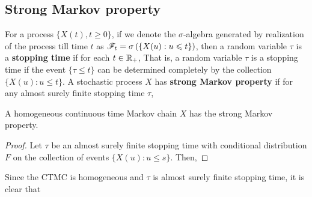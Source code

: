 \documentclass[a4paper,10pt,english]{article}
\begin{document}
\subsection{Strong Markov property}
For a process $\{X(t), t\geqslant 0\}$,  if we denote the $\sigma$-algebra generated by realization of the process till time $t$ as 
$\mathscr{F}_t = \sigma\left(\{X(u): u \leqslant t\}\right)$, 
then a random variable $\tau$ is a \textbf{stopping time} if for each $t \in \mathbb{R}_+$, 
That is, a random variable $\tau$ is a stopping time if the event $\{\tau \leq t\}$ can be determined completely by the collection $\{X(u): u \leqslant t\}$. 
A stochastic process $X$ has \textbf{strong Markov property} if for any almost surely finite stopping time $\tau$, 
\begin{lem}
\label{Lemma:StrongMarkovProperty}
A homogeneous continuous time Markov chain $X$ has the strong Markov property. 
\end{lem}
\begin{proof}
Let $\tau$ be an almost surely finite stopping time with conditional distribution $F$ on the collection of events $\{X(u): u \leq s\}$. 
Then, 
\end{proof}
Since the CTMC is homogeneous and $\tau$ is almost surely finite stopping time, it is clear that 
\end{document}
